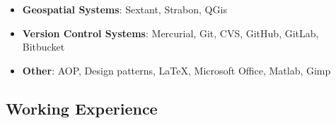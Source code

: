 \documentclass[a4paper,oneside,10pt]{article}
\begin{document}
\begin{itemize}
\begin{itemize}
			\end{itemize}

		\item \textbf{Geospatial Systems}: Sextant, Strabon, QGis

		\item \textbf{Version Control Systems}: Mercurial, Git, CVS, GitHub, GitLab, Bitbucket

		\item \textbf{Other}: AOP, Design patterns, \LaTeX, Microsoft Office, Matlab, Gimp

	\end{itemize}

\subsection*{Working Experience}
\end{document}
